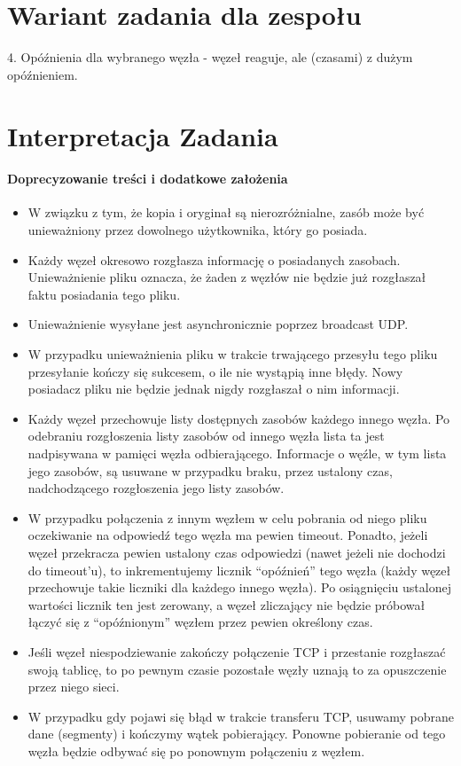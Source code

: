 \documentclass[11pt,oneside]{book}
\newcommand{\+}{\discretionary{\mbox{\scriptsize$\hookleftarrow$}}{}{}}
\begin{document}
\section{Wariant zadania dla zespołu}
4. Opóźnienia dla wybranego węzła - węzeł reaguje, ale (czasami) z dużym opóźnieniem.
\section{Interpretacja Zadania}
\paragraph{Doprecyzowanie treści i dodatkowe założenia}
\begin{itemize}
\item
W związku z tym, że kopia i oryginał są nierozróżnialne, zasób może być unieważniony przez dowolnego użytkownika, który go posiada.
\item
Każdy węzeł okresowo rozgłasza informację o posiadanych zasobach. Unieważnienie pliku oznacza, że żaden z węzłów nie będzie już rozgłaszał faktu posiadania tego pliku.
\item
Unieważnienie wysyłane jest asynchronicznie poprzez broadcast UDP.
\item
W przypadku unieważnienia pliku w trakcie trwającego przesyłu tego pliku przesyłanie kończy się sukcesem, o ile nie wystąpią inne błędy. Nowy posiadacz pliku nie będzie jednak nigdy rozgłaszał o nim informacji.
\item
Każdy węzeł przechowuje listy dostępnych zasobów każdego innego węzła. Po odebraniu rozgłoszenia listy zasobów od innego węzła lista ta jest nadpisywana w pamięci węzła odbierającego. Informacje o węźle, w tym lista jego zasobów, są usuwane w przypadku braku, przez ustalony czas, nadchodzącego rozgłoszenia jego listy zasobów. 
\item
W przypadku połączenia z innym węzłem w celu pobrania od niego pliku oczekiwanie na odpowiedź tego węzła ma pewien timeout. Ponadto, jeżeli węzeł przekracza pewien ustalony czas odpowiedzi (nawet jeżeli nie dochodzi do timeout’u), to inkrementujemy licznik “opóźnień” tego węzła (każdy węzeł przechowuje takie liczniki dla każdego innego węzła). Po osiągnięciu ustalonej wartości licznik ten jest zerowany, a węzeł zliczający nie będzie próbował łączyć się z “opóźnionym” węzłem przez pewien określony czas.
\item
Jeśli węzeł niespodziewanie zakończy połączenie TCP i przestanie rozgłaszać swoją tablicę, to po pewnym czasie pozostałe węzły uznają to za opuszczenie przez niego sieci.
\item
W przypadku gdy pojawi się błąd w trakcie transferu TCP, usuwamy pobrane dane (segmenty) i kończymy wątek pobierający. Ponowne pobieranie od tego węzła będzie odbywać się po ponownym połączeniu z węzłem.
\end{itemize}
\end{document}
